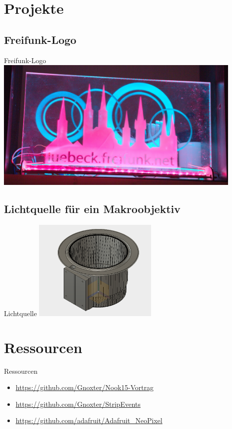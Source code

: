 \documentclass{beamer}
\begin{document}
\section{Projekte}
\subsection{Freifunk-Logo}
\begin{frame}{Freifunk-Logo}
 \centering
 \includegraphics[width=12cm,keepaspectratio=true]{./img/_MGL5102.jpg}
\end{frame}

\subsection{Lichtquelle für ein Makroobjektiv}
\begin{frame}{Lichtquelle}
\centering
 \includegraphics[width=6cm,keepaspectratio=true]{./img/screen.png}
\end{frame}

\section{Ressourcen}
\begin{frame}{Ressourcen}
\begin{itemize}
 \item \url{https://github.com/Gnoxter/Nook15-Vortrag}
 \item \url{https://github.com/Gnoxter/StripEvents}
 \item \url{https://github.com/adafruit/Adafruit_NeoPixel}
\end{itemize}
\end{frame}
\end{document}
